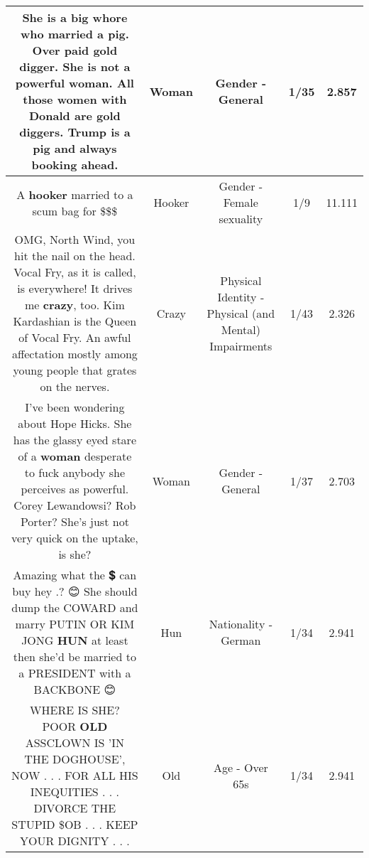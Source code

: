 \documentclass[11pt]{article}
\newlength\mylength
\begin{document}
\begin{center}
\begin{longtable}{|C{.65\mylength}|C{.30\mylength}|C{.12\mylength}|C{.12\mylength}|C{.12\mylength}|}
  \small She is a big whore who married a pig. Over paid gold digger. She is not a powerful \textbf{woman}. All those women with Donald are gold diggers. Trump is a pig and always  booking ahead.\normalsize   & Woman & Gender - General & 1/35 & 2.857 \\  \hline
  \small A \textbf{hooker} married to a scum bag for \$\$\$\normalsize   & Hooker & Gender - Female sexuality & 1/9 & 11.111 \\  \hline
  \small OMG, North Wind, you hit the nail on the head. Vocal Fry, as it is called, is everywhere!  It drives me \textbf{crazy}, too. Kim Kardashian is the Queen of Vocal Fry. An awful affectation mostly among young people that grates on the nerves.\normalsize   & Crazy & Physical Identity - Physical (and Mental) Impairments & 1/43 & 2.326 \\  \hline
  \small I've been wondering about Hope Hicks. She has the glassy eyed stare of a \textbf{woman} desperate to fuck anybody she perceives as powerful. Corey Lewandowsi? Rob Porter?  She's just not very quick on the uptake, is she?\normalsize   & Woman & Gender - General & 1/37 & 2.703 \\  \hline
  \small Amazing what the 💲 can buy hey .? 😊 She should dump the COWARD and marry PUTIN OR KIM JONG \textbf{HUN} at least then she'd be married to a PRESIDENT with a BACKBONE 😊\normalsize   & Hun & Nationality - German & 1/34 & 2.941 \\  \hline
  \small WHERE IS SHE?  POOR \textbf{OLD} ASSCLOWN IS 'IN THE DOGHOUSE', NOW . . . FOR ALL HIS INEQUITIES . . . DIVORCE THE STUPID \$OB . . . KEEP YOUR DIGNITY . . .\normalsize   & Old & Age - Over 65s & 1/34 & 2.941 \\  \hline

\end{longtable}
\end{center}
\end{document}

